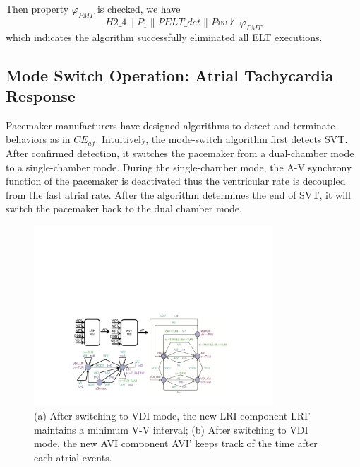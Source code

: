 Then property $\varphi_{PMT}$ is checked, we have
$$H2\_4\|P_1\|PELT\_det\|Pvv\not\models\varphi_{PMT}$$
which indicates the algorithm successfully eliminated all ELT executions.

\subsection{Mode Switch Operation: Atrial Tachycardia Response}
\label{Mode_switch}

Pacemaker manufacturers have designed algorithms to detect and terminate behaviors as in $CE_{af}$. Intuitively, the mode-switch algorithm first detects SVT. After confirmed detection, it switches the pacemaker from a dual-chamber mode to a single-chamber mode. During the single-chamber mode, the A-V synchrony function of the pacemaker is deactivated thus the ventricular rate is decoupled from the fast atrial rate. After the algorithm determines the end of SVT, it will switch the pacemaker back to the dual chamber mode. 
\begin{figure}
		\centering
		\includegraphics[width=0.8\textwidth]{figs/AVI_ms.pdf}
		\caption{\small (a) After switching to \textsf{VDI} mode, the new LRI component \textsf{LRI'} maintains a minimum V-V interval; (b) After switching to \textsf{VDI} mode, the new AVI component \textsf{AVI'} keeps track of the time after each atrial events.}
		\label{fig:avi_ms}
\end{figure}
